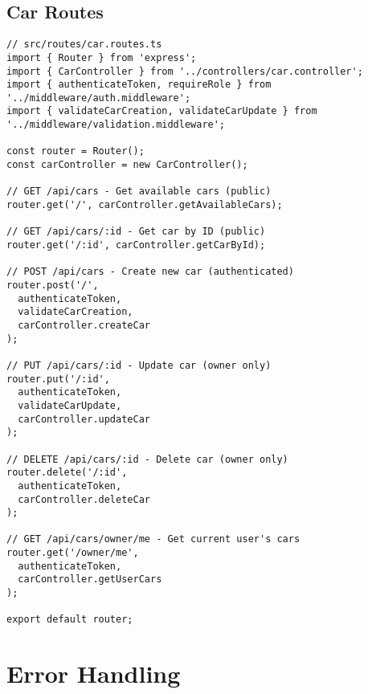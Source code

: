 \documentclass[12pt,a4paper]{article}
\begin{document}
\subsection{Car Routes}
\begin{lstlisting}[caption=Car API Routes]
// src/routes/car.routes.ts
import { Router } from 'express';
import { CarController } from '../controllers/car.controller';
import { authenticateToken, requireRole } from '../middleware/auth.middleware';
import { validateCarCreation, validateCarUpdate } from '../middleware/validation.middleware';

const router = Router();
const carController = new CarController();

// GET /api/cars - Get available cars (public)
router.get('/', carController.getAvailableCars);

// GET /api/cars/:id - Get car by ID (public)
router.get('/:id', carController.getCarById);

// POST /api/cars - Create new car (authenticated)
router.post('/',
  authenticateToken,
  validateCarCreation,
  carController.createCar
);

// PUT /api/cars/:id - Update car (owner only)
router.put('/:id',
  authenticateToken,
  validateCarUpdate,
  carController.updateCar
);

// DELETE /api/cars/:id - Delete car (owner only)
router.delete('/:id',
  authenticateToken,
  carController.deleteCar
);

// GET /api/cars/owner/me - Get current user's cars
router.get('/owner/me',
  authenticateToken,
  carController.getUserCars
);

export default router;
\end{lstlisting}

\section{Error Handling}
\end{document}

